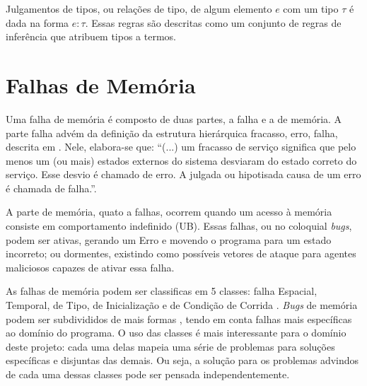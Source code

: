 Julgamentos de tipos, ou relações de tipo, de algum elemento $e$ com um tipo $\tau$ é dada na forma $e:\tau$. Essas regras são descritas como um conjunto de regras de inferência que atribuem tipos a termos. 


\section{Falhas de Memória}
\label{sec:mem-error}

Uma falha de memória é composto de duas partes, a falha e a de memória. A parte falha advém da definição da estrutura hierárquica fracasso, erro, falha, descrita em \citet{FAULTS}. Nele, elabora-se que: ``(...) um fracasso de serviço significa que pelo menos um (ou mais) estados externos do sistema desviaram do estado correto do serviço. Esse desvio é chamado de erro. A julgada ou hipotisada causa de um erro é chamada de falha.''\cite[p. 13, tradução nossa.]{FAULTS}.


A parte de memória, quato a falhas, ocorrem quando um acesso à memória consiste em comportamento indefinido (UB). Essas falhas, ou no coloquial \emph{bugs}, podem ser ativas, gerando um Erro e movendo o programa para um estado incorreto; ou dormentes, existindo como possíveis vetores de ataque para agentes maliciosos capazes de ativar essa falha. 

As falhas de memória podem ser classificas em 5 classes: falha Espacial, 
Temporal, de Tipo, de Inicialização e de Condição de Corrida \cite{Apple22,Google24}.
\emph{Bugs} de memória podem ser subdivididos de mais formas \cite{7KINGDOMS,CWELIST},
tendo em conta falhas mais específicas ao domínio do programa. 
O uso das classes é mais interessante para o domínio deste projeto:
cada uma delas mapeia uma série de problemas para soluções específicas e disjuntas das demais. 
Ou seja, a solução para os problemas advindos de cada uma dessas classes pode ser 
pensada independentemente. 


